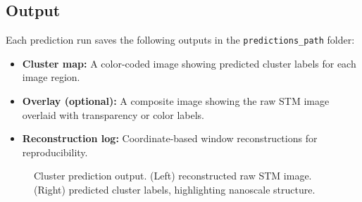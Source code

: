 \documentclass[11pt]{article}
\begin{document}
\subsection*{Output}

Each prediction run saves the following outputs in the \texttt{predictions\_path} folder:

\begin{itemize}
  \item \textbf{Cluster map:} A color-coded image showing predicted cluster labels for each image region.
  \item \textbf{Overlay (optional):} A composite image showing the raw STM image overlaid with transparency or color labels.
  \item \textbf{Reconstruction log:} Coordinate-based window reconstructions for reproducibility.
\end{itemize}

\begin{figure}[H]
\centering
\hspace{1em}
\caption{Cluster prediction output. (Left) reconstructed raw STM image. (Right) predicted cluster labels, highlighting nanoscale structure.}
\end{figure}
\end{document}
